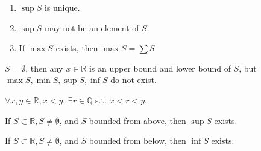 \begin{remarks}
    \hfill

    \begin{enumerate}
        \item $\sup S$ is unique. 
        \item $\sup S$ may not be an element of $S$. 
        \item If $\max S$ exists, then $\max S = \sum S$
    \end{enumerate}
\end{remarks}

\begin{example}
    $S = \emptyset$, then any $x \in \mathbb{R}$ is an upper bound and lower bound of $S$, but $\max S, \min S, \sup S, \inf S$ do not exist.
\end{example}

\begin{theorem}
    $\forall x, y \in \mathbb{R}, x < y$, $\exists r \in \mathbb{Q}$ s.t. 
    $x < r < y$.
\end{theorem}


\begin{theorem}
    If $S \subset \mathbb{R}, S \neq \emptyset$, and $S$ bounded from above, then $\sup S$ exists.
\end{theorem}

\begin{corollary}
    If $S \subset \mathbb{R}, S \neq \emptyset$, and $S$ bounded from below, then $\inf S$ exists.
\end{corollary}

